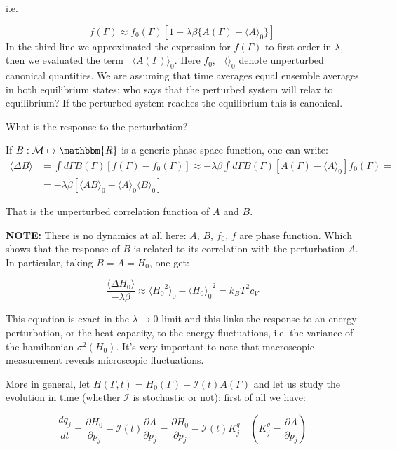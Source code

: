 \documentclass{article}
\newcommand*\mean[1]{\mathop{}\!\langle #1 \rangle}
\begin{document}
i.e.

$$ f(\Gamma) \approx f_0(\Gamma)[1 - \lambda \beta \{ A(\Gamma) - \langle A \rangle_0  \}]$$
In the third line we approximated the expression for $f(\Gamma)$ to first order in $\lambda$, then we evaluated the term $\mean{A(\Gamma)}_0$. 
Here $f_0$, $\mean{}_0$ denote unperturbed canonical quantities. We are assuming that time averages equal ensemble averages in both equilibrium states: who says that the perturbed system will relax to equilibrium? If the perturbed system reaches the equilibrium this is canonical. 

What is the response to the perturbation? 

If $B : \mathcal{M} \mapsto \mathbbm{R} $ is a generic phase space function, one can write:
\begin{align*}
\langle \Delta B \rangle &= \int d \Gamma B(\Gamma) [f(\Gamma) - f_0(\Gamma) ] \approx - \lambda \beta \int d \Gamma B(\Gamma) [ A(\Gamma) - \langle A \rangle_0 ] f_0(\Gamma) =\\ &= - \lambda \beta [\langle A B \rangle_0 - \langle A \rangle_0 \langle B \rangle_0]    
\end{align*}

That is the unperturbed correlation function of $A$ and $B$. \newline

\textbf{NOTE:} There is no dynamics at all here: $A$, $B$, $f_0$, $f$ are phase function. Which shows that the response of $B$ is related to its correlation with the perturbation $A$. In particular, taking $B=A=H_0$, one get:

\begin{equation}
\frac{ \langle \Delta H_0 \rangle }{ - \lambda \beta } \approx \langle {H_0}^2 \rangle_0 - \langle H_0 {\rangle_0}^2 = k_B T^2 c_V
\end{equation}

This equation is exact in the $\lambda \to 0$ limit and this links the response to an energy perturbation, or the heat capacity, to the energy fluctuations, i.e. the variance of the hamiltonian $\sigma^2(H_0)$. It's very important to note that macroscopic measurement reveals microscopic fluctuations.\newline



More in general, let $H(\Gamma,t)=H_0(\Gamma) - \mathcal{I}(t) A(\Gamma)$ and let us study the evolution in time (whether $\mathcal{I}$ is stochastic or not): first of all we have:

$$\frac{d q_j}{ dt } = \frac{\partial H_0}{ \partial p_j} - \mathcal{I}(t) \frac{\partial A}{\partial p_j} = \frac{\partial H_0}{ \partial p_j} - \mathcal{I}(t) K^q_j \quad (K^q_j = \frac{\partial A}{\partial p_j})$$
\end{document}
